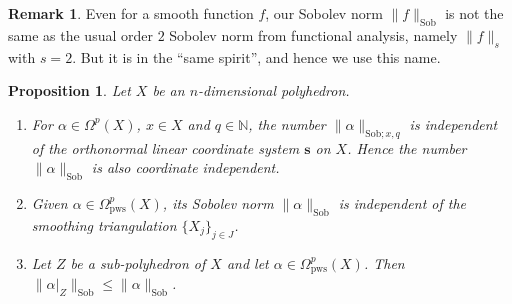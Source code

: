 \documentclass[10pt, a4paper]{amsart}
\newtheorem{prop}[equation]{Proposition}
\theoremstyle{definition}
\newtheorem{rem}[equation]{Remark}
\numberwithin{equation}{section}
\newcommand{\mrm}[1]{\mathrm{#1}}
\newcommand{\mbb}[1]{\mathbb{#1}}
\newcommand{\bsym}[1]{\boldsymbol{#1}}
\newcommand{\norm}[1]{\lVert #1 \rVert}
\newcommand{\N}{\mbb{N}}
\begin{document}
\begin{rem}
Even for a smooth function $f$, our Sobolev norm 
$\norm{f}_{\mrm{Sob}}$ is not the same as the
usual order $2$ Sobolev norm from functional analysis, namely
$\norm{f}_s$ with $s = 2$. But it is in the ``same spirit'', and hence we use
this name.
\end{rem}

\begin{prop}
Let $X$ be an $n$-dimensional polyhedron.
\begin{enumerate}
\item For $\alpha \in \Omega^p(X)$, $x \in X$ and $q \in \N$, the number 
$\norm{\alpha}_{\mrm{Sob}; x, q}$ is  independent of the orthonormal linear
coordinate system $\bsym{s}$ on $X$. Hence the number
$\norm{\alpha}_{\mrm{Sob}}$ is also coordinate independent.

\item Given $\alpha \in \Omega^p_{\mrm{pws}}(X)$, its Sobolev norm 
$\norm{\alpha}_{\mrm{Sob}}$ is independent of the  smoothing triangulation
$\{ X_j \}_{j \in J}$.

\item Let $Z$ be a sub-polyhedron of $X$ and let
$\alpha \in \Omega^p_{\mrm{pws}}(X)$. Then 
$\norm{\alpha|_Z}_{\mrm{Sob}} \leq \norm{\alpha}_{\mrm{Sob}}$.
\end{enumerate}
\end{prop}
\end{document}
